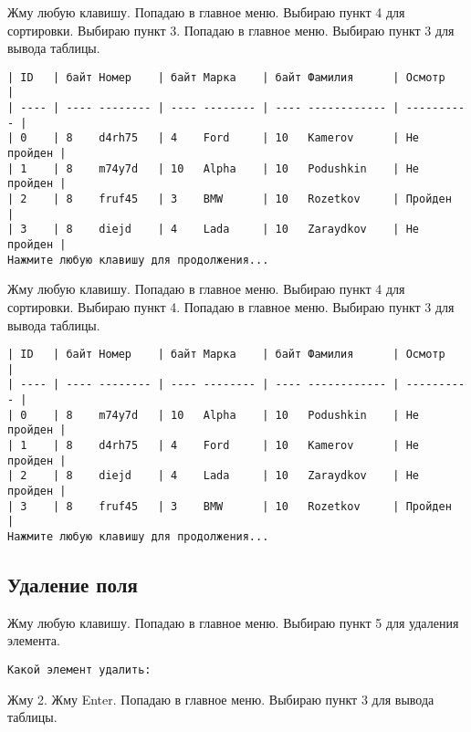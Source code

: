 Жму любую клавишу. Попадаю в главное меню. Выбираю пункт 4 для сортировки. Выбираю пункт 3. Попадаю в главное меню. Выбираю пункт 3 для вывода таблицы.

\begin{tcolorbox}
\begin{verbatim}
| ID   | байт Номер    | байт Марка    | байт Фамилия      | Осмотр     |
| ---- | ---- -------- | ---- -------- | ---- ------------ | ---------- |
| 0    | 8    d4rh75   | 4    Ford     | 10   Kamerov      | Не пройден |
| 1    | 8    m74y7d   | 10   Alpha    | 10   Podushkin    | Не пройден |
| 2    | 8    fruf45   | 3    BMW      | 10   Rozetkov     | Пройден    |
| 3    | 8    diejd    | 4    Lada     | 10   Zaraydkov    | Не пройден |
Нажмите любую клавишу для продолжения...
\end{verbatim}
\end{tcolorbox}

Жму любую клавишу. Попадаю в главное меню. Выбираю пункт 4 для сортировки. Выбираю пункт 4. Попадаю в главное меню. Выбираю пункт 3 для вывода таблицы.

\begin{tcolorbox}
\begin{verbatim}
| ID   | байт Номер    | байт Марка    | байт Фамилия      | Осмотр     |
| ---- | ---- -------- | ---- -------- | ---- ------------ | ---------- |
| 0    | 8    m74y7d   | 10   Alpha    | 10   Podushkin    | Не пройден |
| 1    | 8    d4rh75   | 4    Ford     | 10   Kamerov      | Не пройден |
| 2    | 8    diejd    | 4    Lada     | 10   Zaraydkov    | Не пройден |
| 3    | 8    fruf45   | 3    BMW      | 10   Rozetkov     | Пройден    |
Нажмите любую клавишу для продолжения...
\end{verbatim}
\end{tcolorbox}

\subsection{Удаление поля}

Жму любую клавишу. Попадаю в главное меню. Выбираю пункт 5 для удаления элемента.

\begin{tcolorbox}
\begin{verbatim}
Какой элемент удалить:
\end{verbatim}
\end{tcolorbox}

Жму 2. Жму Enter. Попадаю в главное меню. Выбираю пункт 3 для вывода таблицы.

